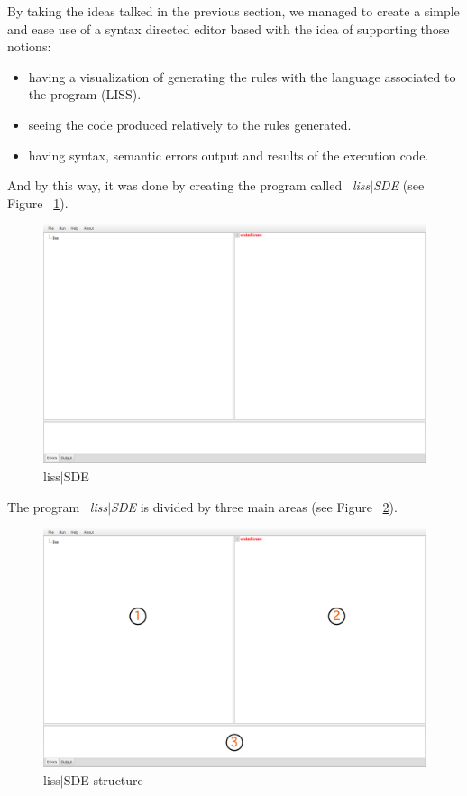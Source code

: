 \documentclass[
  oneside,
  11pt, a4paper,
  footinclude=true,
  headinclude=true,
  cleardoublepage=empty
]{scrbook}
\begin{document}
By taking the ideas talked in the previous section, we managed to create a simple and ease use of a syntax directed editor based with the idea of supporting those notions:

\begin{itemize}
\item having a visualization of generating the rules with the language associated to the program (LISS).
\item seeing the code produced relatively to the rules generated.
\item having syntax, semantic errors output and results of the execution code.
\end{itemize}

And by this way, it was done by creating the program called ~\textit{liss$|$SDE} (see Figure ~\ref{fig:LISS-SDE}).

\begin{figure}[h!]
  \centering
    \includegraphics[width=1\textwidth]{img/LISS-SDE.png}
    \caption{liss$|$SDE}
    \label{fig:LISS-SDE}
\end{figure}

The program ~\textit{liss$|$SDE} is divided by three main areas (see Figure ~\ref{fig:LISS-SDE_structure}).

\begin{figure}[h!]
  \centering
    \includegraphics[width=1\textwidth]{img/LISS-SDE_organization.png}
    \caption{liss$|$SDE structure}
    \label{fig:LISS-SDE_structure}
\end{figure}
\end{document}
